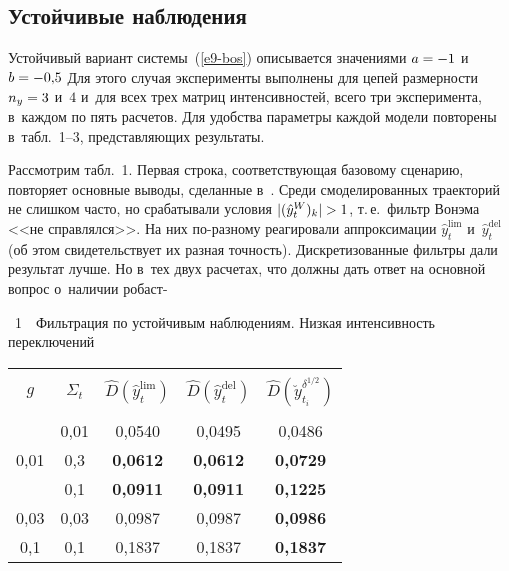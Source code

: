 \begin{multicols}{2}
\vspace*{-2pt} 

\subsection{Устойчивые наблюдения}


      Устойчивый вариант системы~(\ref{e9-bos}) описывается значениями $a\hm=-1$ 
и~$b\hm= -0{,}5$ Для этого случая эксперименты выполнены для цепей 
раз\-мер\-ности $n_y\hm=3$ и~$4$ и~для всех трех матриц 
интенсивностей, всего три эксперимента, в~каж\-дом по пять расчетов. Для 
удобства па\-ра\-мет\-ры каж\-дой модели повторены в~табл.~1--3, 
пред\-став\-ля\-ющих ре\-зуль\-таты.





      
      Рассмотрим табл.~1. Первая строка, со\-от\-вет\-ст\-ву\-ющая базовому 
сценарию, повторяет основные выводы, сделанные в~\cite{19-bos}. Среди 
смоделированных траекторий не слишком час\-то, но срабатывали условия 
      $\vert (\hat{y}_t^W)_k \vert \hm>1$, т.\,е.\ фильтр Вонэма <<не 
справ\-лял\-ся>>. На них по-раз\-но\-му реагировали аппроксимации 
$\hat{y}_t^{\mathrm{lim}}$ и~$\hat{y}_t^{\mathrm{del}}$ (об этом свидетельствует их
разная точ\-ность). Дискретизованные фильт\-ры дали результат лучше. Но в~тех двух 
расчетах, что должны дать ответ на основной вопрос о~наличии робаст-\linebreak\vspace*{-12pt}

\vspace*{9pt}
\begin{center}
\parbox{78mm}{{{\tablename~1}\ \ \small{Фильтрация по устойчивым наблюдениям. Низкая интенсивность 
переключений
}}
}


      \vspace*{6pt}
      
  {\small    
  \tabcolsep=7.5pt
      \begin{tabular}{|c|c|c|c|c|}
      \hline
&&&&\\[-9pt]
$g$& $\Sigma_t$& $\hat{D}\left(\hat{y}_t^{\mathrm{lim}}\right)$  &  $\hat{D}\left(\hat{y}_t^{\mathrm{del}}\right)$ 
&$\hat{D}\left(\breve{y}_{t_i}^{\delta^{1/2}}\right)$\\
&&&&\\[-9pt]
\hline
 & 0{,}01  &0,0540&0,0495&0,0486\\
0{,}01&0{,}3\hphantom{9}&\textbf{0,0612}&\textbf{0,0612}&\textbf{0,0729}\\
&0{,}1\hphantom{9}&\textbf{0,0911}&\textbf{0,0911}&\textbf{0,1225}\\
\hline
0{,}03 & 0{,}03&0,0987&0,0987&\textbf{0,0986}\\
\hline
0{,}1\hphantom{9} & 0{,}1\hphantom{9}&0,1837&0,1837&\textbf{0,1837}\\
\hline
\end{tabular}

}
\end{center}
\end{multicols}
